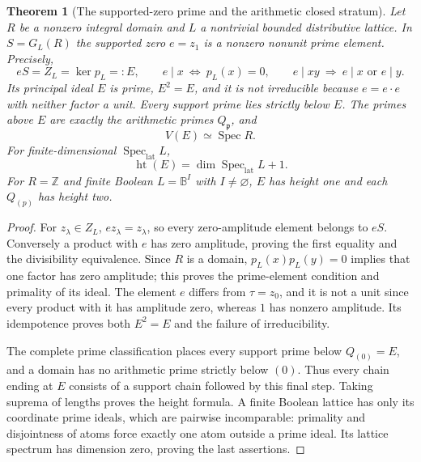 \documentclass[11pt,a4paper]{article}
\newtheorem{theorem}{Theorem}[section]
\theoremstyle{definition}\newtheorem{definition}[theorem]{Definition}
\newcommand{\Z}{\mathbb Z}\newcommand{\Q}{\mathbb Q}
\newcommand{\B}{\mathbb B}\newcommand{\N}{\mathbb N}
\newcommand{\Spec}{\operatorname{Spec}}\newcommand{\SpecMon}{\operatorname{Spec}_{\mathrm{mon}}}
\newcommand{\SpecLat}{\operatorname{Spec}_{\mathrm{lat}}}
\begin{document}
\begin{theorem}[The supported-zero prime and the arithmetic closed stratum]\label{thm:supported-zero-prime}
Let $R$ be a nonzero integral domain and $L$ a nontrivial bounded distributive lattice. In $S=G_L(R)$ the supported zero $e=z_1$ is a nonzero nonunit prime element. Precisely,
\begin{equation}\label{eq:e-divisibility}
 eS=Z_L=\ker p_L=:E,\qquad
 e\mid x\ \Longleftrightarrow\ p_L(x)=0,\qquad
 e\mid xy\ \Longrightarrow\ e\mid x\text{ or }e\mid y.
\end{equation}
Its principal ideal $E$ is prime, $E^2=E$, and it is not irreducible because $e=e\cdot e$ with neither factor a unit. Every support prime lies strictly below $E$. The primes above $E$ are exactly the arithmetic primes $Q_{\mathfrak p}$, and
\[
 V(E)\simeq\Spec R.
\]
For finite-dimensional $\SpecLat L$,
\[
 \operatorname{ht}(E)=\dim\SpecLat L+1.
\]
For $R=\Z$ and finite Boolean $L=\B^I$ with $I\ne\varnothing$, $E$ has height one and each $Q_{(p)}$ has height two.
\end{theorem}
\begin{proof}
For $z_\lambda\in Z_L$, $ez_\lambda=z_\lambda$, so every zero-amplitude element belongs to $eS$. Conversely a product with $e$ has zero amplitude, proving the first equality and the divisibility equivalence. Since $R$ is a domain, $p_L(x)p_L(y)=0$ implies that one factor has zero amplitude; this proves the prime-element condition and primality of its ideal. The element $e$ differs from $\tau=z_0$, and it is not a unit since every product with it has amplitude zero, whereas $1$ has nonzero amplitude. Its idempotence proves both $E^2=E$ and the failure of irreducibility.

The complete prime classification places every support prime below $Q_{(0)}=E$, and a domain has no arithmetic prime strictly below $(0)$. Thus every chain ending at $E$ consists of a support chain followed by this final step. Taking suprema of lengths proves the height formula. A finite Boolean lattice has only its coordinate prime ideals, which are pairwise incomparable: primality and disjointness of atoms force exactly one atom outside a prime ideal. Its lattice spectrum has dimension zero, proving the last assertions.
\end{proof}
\end{document}

